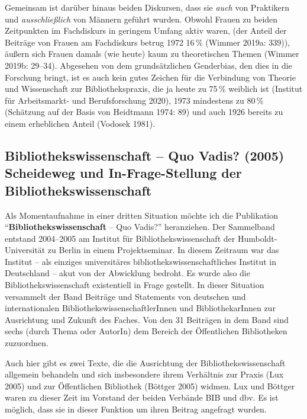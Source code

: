 \documentclass[a4paper,
fontsize=11pt,
oneside,
numbers=noperiodatend,
parskip=half-,
bibliography=totoc,
final
]{scrartcl}
\begin{document}
Gemeinsam ist darüber hinaus beiden Diskursen, dass sie \emph{auch} von
Praktikern und \emph{ausschließlich} von Männern geführt wurden. Obwohl
Frauen zu beiden Zeitpunkten im Fachdiskurs in geringem Umfang aktiv
waren, (der Anteil der Beiträge von Frauen am Fachdiskurs betrug 1972
16\,\% (Wimmer 2019a: 339)), äußern sich Frauen damals (wie heute) kaum
zu theoretischen Themen (Wimmer 2019b: 29--34). Abgesehen von dem
grundsätzlichen Genderbias, den dies in die Forschung bringt, ist es
auch kein gutes Zeichen für die Verbindung von Theorie und Wissenschaft
zur Bibliothekspraxis, die ja heute zu 75\,\% weiblich ist (Institut für
Arbeitsmarkt- und Berufsforschung 2020), 1973 mindestens zu 80\,\%
(Schätzung auf der Basis von Heidtmann 1974: 89) und auch 1926 bereits
zu einem erheblichen Anteil (Vodosek 1981).

\hypertarget{bibliothekswissenschaft-quo-vadis-2005-scheideweg-und-in-frage-stellung-der-bibliothekswissenschaft}{%
\subsection{Bibliothekswissenschaft -- Quo Vadis? (2005) Scheideweg
und In-Frage-Stellung der
Bibliothekswissenschaft}\label{bibliothekswissenschaft-quo-vadis-2005-scheideweg-und-in-frage-stellung-der-bibliothekswissenschaft}}

Als Momentaufnahme in einer dritten Situation möchte ich die Publikation
\enquote{\textbf{Bibliothekswissenschaft} -- Quo Vadis?} heranziehen.
Der Sammelband entstand 2004--2005 am Institut für
Bibliothekswissenschaft der Humboldt-Universität zu Berlin in einem
Projektseminar. In diesem Zeitraum war das Institut -- als einziges
universitäres bibliothekswissenschaftliches Institut in Deutschland --
akut von der Abwicklung bedroht. Es wurde also die
Bibliothekswissenschaft existentiell in Frage gestellt. In dieser
Situation versammelt der Band Beiträge und Statements von deutschen und
internationalen BibliothekswissenschaftlerInnen und BibliothekarInnen
zur Ausrichtung und Zukunft des Faches. Von den 31 Beiträgen in dem Band
sind sechs (durch Thema oder AutorIn) dem Bereich der Öffentlichen
Bibliotheken zuzuordnen.

Auch hier gibt es zwei Texte, die die Ausrichtung der
Bibliothekswissenschaft allgemein behandeln und sich insbesondere ihrem
Verhältnis zur Praxis (Lux 2005) und zur Öffentlichen Bibliothek
(Böttger 2005) widmen. Lux und Böttger waren zu dieser Zeit im Vorstand
der beiden Verbände BIB und dbv. Es ist möglich, dass sie in dieser
Funktion um ihren Beitrag angefragt wurden.
\end{document}
